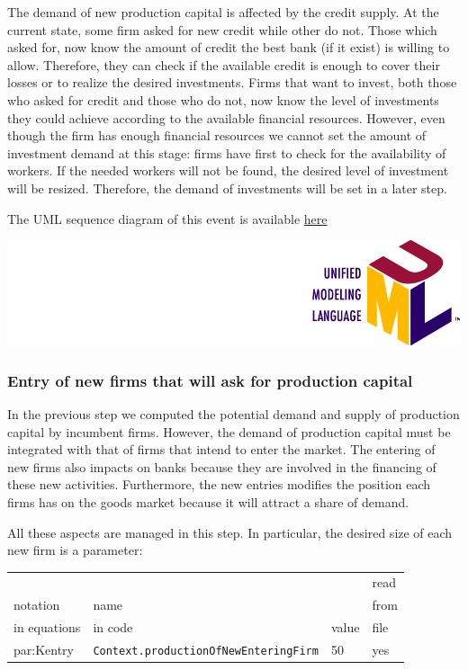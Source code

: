 \documentclass{book}
\newcommand{\doclocation}{file:///Users/giulioni/Documents/workspace/gabriele/docs}
\begin{document}
The demand of new production capital is affected by the credit supply.
At the current state, some firm asked for new credit while other do not. 
Those which asked for, now know the amount of credit the best bank (if it exist) is willing to allow.
Therefore, they can check if the available credit is enough to cover their losses or to realize the desired investments. 
Firms that want to invest, both those who asked for credit and those who do not, now know the level of investments they could achieve according to the available financial resources. 
However, even though the firm has enough financial resources we cannot set the amount of investment demand at this stage: firms have first to check for the availability of workers. If the needed workers will not be found, the desired level of investment will be resized. Therefore, the demand of investments will be set in a later step.

\vskip3mm
The UML sequence diagram of this event is available \href{\doclocation/umldoc/setPossibleInvestment.html}{here}
\begin{marginfigure}
	\includegraphics[scale=0.1]{uml.png}
\end{marginfigure}


\subsubsection{Entry of new firms that will ask for production capital}

In the previous step we computed the potential demand and supply of production capital by incumbent firms. However, the demand of production capital must be integrated with that of firms that intend to enter the market. 
The entering of new firms also impacts on banks because they are involved in the financing of these new activities. Furthermore, the new entries modifies the position each firms has on the goods market because it will attract a share of demand.

All these aspects are managed in this step.
In particular, the desired size of each new firm is a parameter:\\

\vskip2mm
\noindent
\begin{tabular}{l l l l}
	\hline
	& &&read\\
	notation& name &&from\\
	in equations& in code&value&file\\
	\hline
	\hline
 \gls{par:Kentry}&\verb+Context.productionOfNewEnteringFirm+&50&yes\\
	\hline
\end{tabular}
\end{document}
